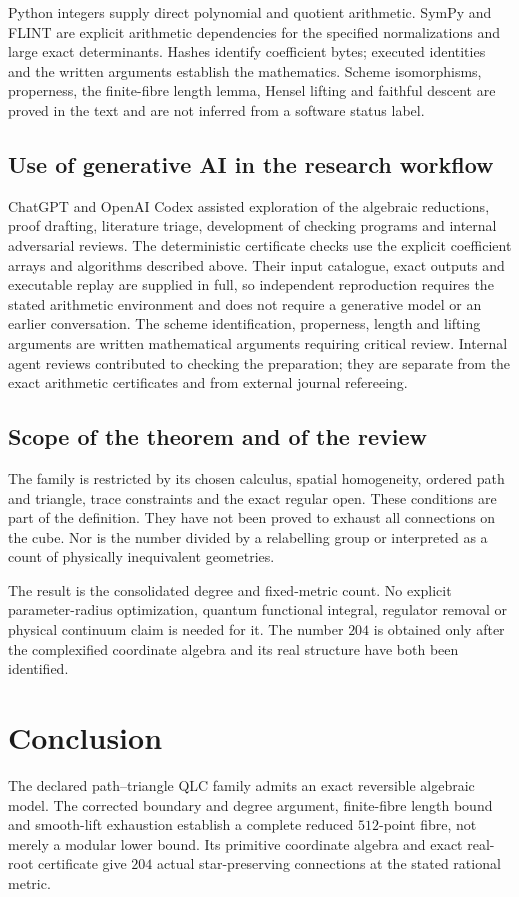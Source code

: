 \documentclass[11pt,a4paper]{article}
\theoremstyle{remark}\newtheorem{remark}[theorem]{Remark}
\begin{document}
Python integers supply direct polynomial and quotient arithmetic.
SymPy and FLINT are explicit arithmetic dependencies for the specified
normalizations and large exact determinants. Hashes identify coefficient
bytes; executed identities and the written arguments establish the
mathematics. Scheme isomorphisms, properness, the finite-fibre length
lemma, Hensel lifting and faithful descent are proved in the text and
are not inferred from a software status label.

\subsection{Use of generative AI in the research workflow}
ChatGPT and OpenAI Codex assisted exploration of the algebraic reductions,
proof drafting, literature triage, development of checking programs and
internal adversarial reviews. The deterministic certificate checks use the
explicit coefficient arrays and algorithms described above. Their input
catalogue, exact outputs and executable replay are supplied in full, so
independent reproduction requires the stated arithmetic environment and
does not require a generative model or an earlier conversation.
The scheme identification, properness, length and lifting arguments are
written mathematical arguments requiring critical review. Internal agent
reviews contributed to checking the preparation; they are separate from
the exact arithmetic certificates and from external journal refereeing.

\subsection{Scope of the theorem and of the review}
The family is restricted by its chosen calculus, spatial homogeneity,
ordered path and triangle, trace constraints and the exact regular
open. These conditions are part of the definition. They have not been
proved to exhaust all connections on the cube. Nor is the number
divided by a relabelling group or interpreted as a count of physically
inequivalent geometries.

The result is the consolidated degree and fixed-metric count.
No explicit parameter-radius optimization, quantum functional integral,
regulator removal or physical continuum claim is needed for it.
The number $204$ is obtained only after the complexified coordinate
algebra and its real structure have both been identified.

\section{Conclusion}
The declared path--triangle QLC family admits an exact reversible
algebraic model. The corrected boundary and degree argument, finite-fibre
length bound and smooth-lift exhaustion establish a complete reduced
$512$-point fibre, not merely a modular lower bound. Its primitive
coordinate algebra and exact real-root certificate give $204$ actual
star-preserving connections at the stated rational metric.
\end{document}
